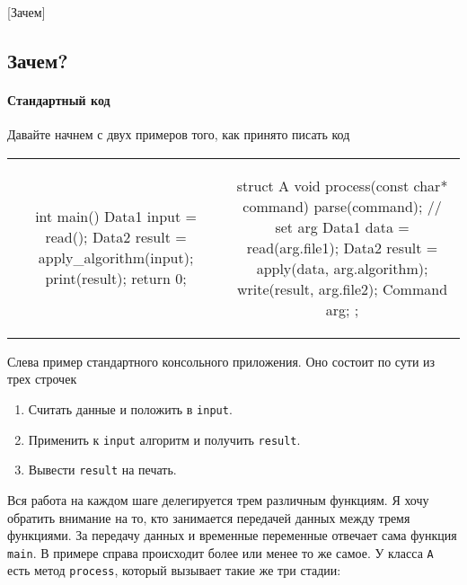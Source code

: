 [Зачем]


\subsection{Зачем?}

\paragraph{Стандартный код}

Давайте начнем с двух примеров того, как принято писать код
\begin{center}
\begin{tabular}{cc}
{
\begin{minipage}[\baselineskip]{8cm}
\begin{cppcode}[numbers = none]



int main() {
  Data1 input = read();
  Data2 result = apply_algorithm(input);
  print(result);
  return 0;
}
\end{cppcode}
\end{minipage}
}&{
\begin{minipage}[\baselineskip]{9cm}
\begin{cppcode}[numbers = none]
struct A {
  void process(const char* command) {
    parse(command); // set arg
    Data1 data = read(arg.file1);
    Data2 result = apply(data, arg.algorithm);
    write(result, arg.file2);
  }
  Command arg;
};
\end{cppcode}
\end{minipage}
}
\end{tabular}
\end{center}
Слева пример стандартного консольного приложения.
Оно состоит по сути из трех строчек
\begin{enumerate}
\item Считать данные и положить в \verb"input".

\item Применить к \verb"input" алгоритм и получить \verb"result".

\item Вывести \verb"result" на печать.
\end{enumerate}
Вся работа на каждом шаге делегируется трем различным функциям.
Я хочу обратить внимание на то, кто занимается передачей данных между тремя функциями.
За передачу данных и временные переменные отвечает сама функция \verb"main".
В примере справа происходит более или менее то же самое.
У класса \verb"A" есть метод \verb"process", который вызывает такие же три стадии:
